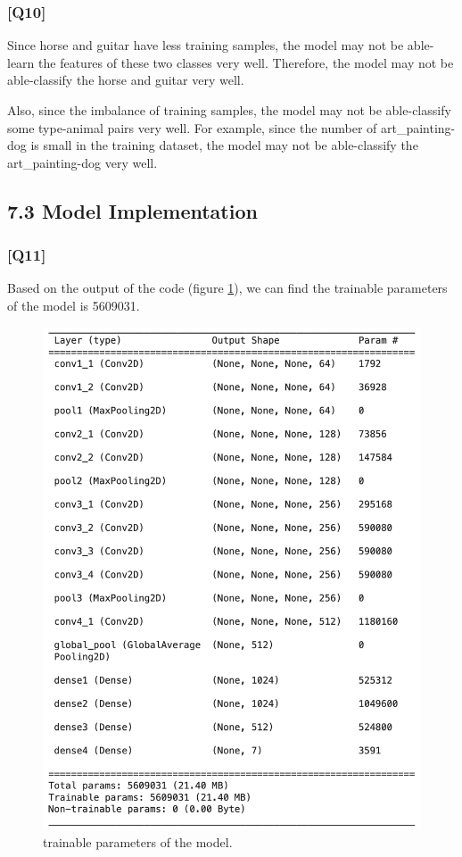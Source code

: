 \documentclass{article}
\begin{document}
\subsubsection*{[Q10]}
Since horse and guitar have less training samples, the model may not be able-learn the features of these two classes very well.
Therefore, the model may not be able-classify the horse and guitar very well.

Also, since the imbalance of training samples, the model may not be able-classify some type-animal pairs very well. For example, since the number of art\_painting-dog is small in the training dataset, the model may not be able-classify the art\_painting-dog very well.


\subsection*{7.3 Model Implementation}

\subsubsection*{[Q11]}

Based on the output of the code (figure \ref{fig:trainable_parameters_class}), we can find the trainable parameters of the model is 5609031.

\begin{figure}[!ht]
    \centering
    \includegraphics[width=\textwidth]{./pic/trainable_para_model2.png}
    \caption{trainable parameters of the model.}
    \label{fig:trainable_parameters_class}
\end{figure}
\end{document}
